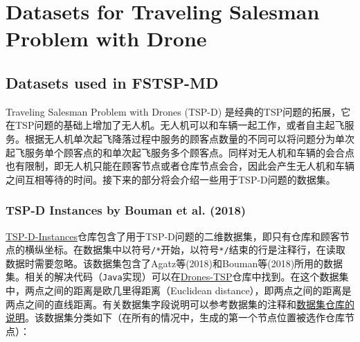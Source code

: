 \part{Datasets for Traveling Salesman Problem with Drone}

\chapter{Datasets used in FSTSP-MD}

Traveling Salesman Problem with Drones (TSP-D) 是经典的TSP问题的拓展，它在TSP问题的基础上增加了无人机。无人机可以和车辆一起工作，或者自主起飞服务。根据无人机单次起飞降落过程中服务的顾客点数量的不同可以将问题分为单次起飞服务单个顾客点的和单次起飞服务多个顾客点。同样对无人机和车辆的会合点也有限制，即无人机只能在顾客节点或者仓库节点会合，因此会产生无人机和车辆之间互相等待的时间。接下来的部分将会介绍一些用于TSP-D问题的数据集。

\section{TSP-D Instances by Bouman et al. (2018)}\label{sec:tsp-d-instances-by-bouman-et-al-2018}

\href{https://github.com/pcbouman-eur/TSP-D-Instances?tab=readme-ov-file}{TSP-D-Instances}仓库包含了用于TSP-D问题的二维数据集，即只有仓库和顾客节点的横纵坐标。在数据集中以符号\texttt{/*}开始，以符号\texttt{*/}结束的行是注释行，在读取数据时需要忽略。该数据集包含了Agatz等(2018)\cite{agatzOptimizationApproachesTraveling2018}和Bouman等(2018)\cite{boumanDynamicProgrammingApproaches2018}所用的数据集。相关的解决代码（\texttt{Java}实现）可以在\href{https://github.com/pcbouman-eur/Drones-TSP?tab=readme-ov-file}{Drones-TSP}仓库中找到。在这个数据集中，两点之间的距离是欧几里得距离（Euclidean distance），即两点之间的距离是两点之间的直线距离。有关数据集字段说明可以参考数据集的注释和\href{https://github.com/pcbouman-eur/TSP-D-Instances?tab=readme-ov-file}{数据集仓库的说明}。该数据集分类如下（在所有的情况中，生成的第一个节点位置被选作仓库节点）：

